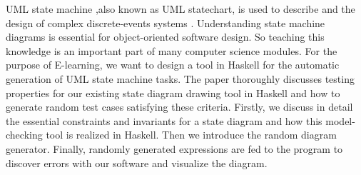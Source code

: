 UML state machine \cite{harel_naamad_1996} ,also known as UML statechart, is used to describe and the design of complex discrete-events systems \cite{harel_1987,harel_naamad_1996}.
Understanding state machine diagrams is essential for object-oriented software design.
So teaching this knowledge is an important part of many computer science modules.
For the purpose of E-learning,  we want to design a tool in Haskell for the automatic generation of UML state machine tasks.
The paper thoroughly discusses testing properties for our existing state diagram drawing tool in Haskell \cite{jun_hao_tan} and how to generate random test cases satisfying these criteria.
Firstly, we discuss in detail the essential constraints and invariants for a state diagram and how this model-checking tool is realized in Haskell. 
Then we introduce the random diagram generator. 
Finally, randomly generated expressions are fed to the program to discover errors with our software and visualize the diagram.

